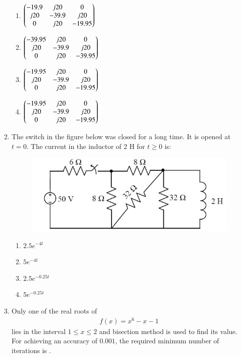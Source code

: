 \documentclass[journal,12pt,onecolumn]{IEEEtran}
\theoremstyle{remark}
\begin{document}
\begin{enumerate}
\begin{multicols}{2}
\begin{enumerate}
\item $\begin{pmatrix}-19.9 & j20 & 0 \\ j20 & -39.9 & j20 \\ 0 & j20 & -19.95\end{pmatrix}$
\item $\begin{pmatrix}-39.95 & j20 & 0 \\ j20 & -39.9 & j20 \\ 0 & j20 & -39.95\end{pmatrix}$
\item $\begin{pmatrix}-19.95 & j20 & 0 \\ j20 & -39.9 & j20 \\ 0 & j20 & -19.95\end{pmatrix}$
\item $\begin{pmatrix}-19.95 & j20 & 0 \\ j20 & -39.9 & j20 \\ 0 & j20 & -19.95\end{pmatrix}$
\end{enumerate}
\end{multicols}

\item The switch in the figure below was closed for a long time. It is opened at $t=0$.  
The current in the inductor of 2 H for $t \geq 0$ is:  
\begin{figure}[H]
    \centering
    \includegraphics[width=0.5\columnwidth]{figs/41.png}
    \caption{}
    \label{fig:placeholder}
\end{figure}


\begin{multicols}{2}
\begin{enumerate}
\item $2.5 e^{-4t}$
\item $5 e^{-4t}$
\item $2.5 e^{-0.25t}$
\item $5 e^{-0.25t}$
\end{enumerate}
\end{multicols}



\item Only one of the real roots of 
\begin{align*}
    f(x) = x^6 - x - 1
\end{align*}
lies in the interval \(1 \leq x \leq 2\) and bisection method is used to find its value. For achieving an accuracy of \(0.001\), the required minimum number of iterations is \underline{\hspace{2cm}}.


\end{enumerate}
\end{document}

